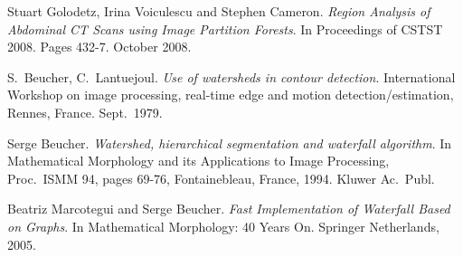 \documentclass{jfp}
\begin{document}
\begin{thebibliography}{99}

 Stuart Golodetz, Irina Voiculescu
  and Stephen Cameron.  {\em Region Analysis of Abdominal CT Scans
    using Image Partition Forests}. In Proceedings of CSTST
  2008. Pages 432-7. October 2008.

 S.\ Beucher, C.\ Lantuejoul. {\em
  Use of watersheds in contour detection}. International Workshop on
  image processing, real-time edge and motion detection/estimation,
  Rennes, France. Sept.\ 1979.

 Serge Beucher. {\em Watershed,
  hierarchical segmentation and waterfall algorithm}. In Mathematical
  Morphology and its Applications to Image Processing, Proc.\ ISMM 94,
  pages 69-76, Fontainebleau, France, 1994. Kluwer Ac.\ Publ.

 Beatriz Marcotegui and Serge Beucher. {\em Fast
  Implementation of Waterfall Based on Graphs}. In {Mathematical
  Morphology: 40 Years On}. Springer Netherlands, 2005.

\end{thebibliography}
\end{document}
